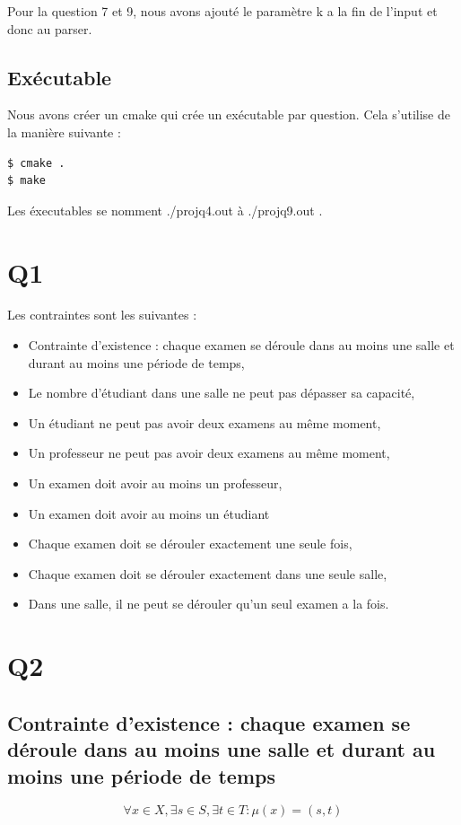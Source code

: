 \documentclass[a4paper,11pt]{article}
\begin{document}
Pour la question 7 et 9, nous avons ajouté le paramètre k a la fin de l'input et donc au parser.

\subsection{Exécutable}

Nous avons créer un cmake qui crée un exécutable par question.
Cela s'utilise de la manière suivante :
\begin{lstlisting}
$ cmake . 
$ make 
\end{lstlisting}
Les éxecutables se nomment ./projq4.out à ./projq9.out .

\section{Q1}
Les contraintes sont les suivantes :
\begin{itemize}
  \item Contrainte d'existence : chaque examen se déroule dans au moins une salle et durant au moins une période de temps,
  \item Le nombre d'étudiant dans une salle ne peut pas dépasser sa capacité,
  \item Un étudiant ne peut pas avoir deux examens au même moment,
  \item Un professeur ne peut pas avoir deux examens au même moment,
  \item Un examen doit avoir au moins un professeur,
  \item Un examen doit avoir au moins un étudiant
  \item Chaque examen doit se dérouler exactement une seule fois,
  \item Chaque examen doit se dérouler exactement dans une seule salle,
  \item Dans une salle, il ne peut se dérouler qu'un seul examen a la fois.
\end{itemize}


\section{Q2}
\subsection{Contrainte d'existence : chaque examen se déroule dans au moins une salle et durant au moins une période de temps}
\begin{displaymath}
	\forall x \in X, \exists s \in S, \exists t \in T : \mu(x) = (s,t) 
\end{displaymath}
\end{document}
